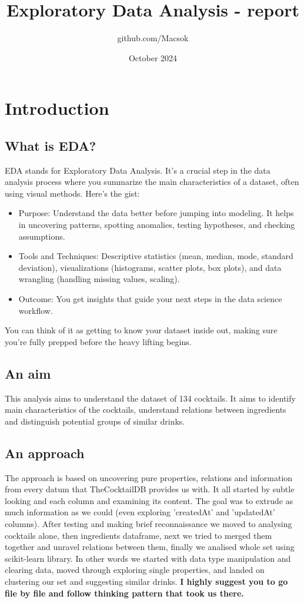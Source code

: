 \documentclass[a4paper]{article}
\title{Exploratory Data Analysis - report}
\author{github.com/Macsok}
\date{October 2024}
\begin{document}
\maketitle
\vspace{5cm}

\section{Introduction}
\subsection{What is EDA?}
EDA stands for Exploratory Data Analysis. It’s a crucial step in the data analysis process where you summarize the main characteristics of a dataset, often using visual methods. Here’s the gist:
    \begin{itemize}
        \item Purpose: Understand the data better before jumping into modeling. It helps in uncovering patterns, spotting anomalies, testing hypotheses, and checking assumptions.

        \item Tools and Techniques: Descriptive statistics (mean, median, mode, standard deviation), visualizations (histograms, scatter plots, box plots), and data wrangling (handling missing values, scaling).

        \item Outcome: You get insights that guide your next steps in the data science workflow.
    \end{itemize}
You can think of it as getting to know your dataset inside out, making sure you’re fully prepped before the heavy lifting begins.

\subsection{An aim}
This analysis aims to understand the dataset of 134 cocktails. It aims to identify main characteristics of the cocktails, understand relations between ingredients and distinguish potential groups of similar drinks.

\subsection{An approach}
The approach is based on uncovering pure properties, relations and information from every datum that TheCocktailDB provides us with. It all started by subtle looking and each column and examining its content. The goal was to extrude as much information as we could (even exploring 'createdAt' and 'updatedAt' columns). After testing and making brief reconnaissance we moved to analysing cocktails alone, then ingredients dataframe, next we tried to merged them together and unravel relations between them, finally we analised whole set using scikit-learn library. In other words we started with data type manipulation and clearing data, moved through exploring single properties, and landed on clustering our set and suggesting similar drinks. \textbf{I highly suggest you to go file by file and follow thinking pattern that took us there.}
\end{document}
